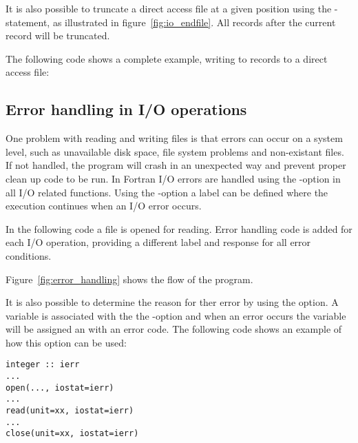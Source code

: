 
It is also possible to truncate a direct access file at a given position using the -statement, as illustrated in figure~\ref{fig:io_endfile}. All records after the current record will be truncated.


The following code shows a complete example, writing to records to a direct access file:



\subsection{Error handling in I/O operations}

One problem with reading and writing files is that errors can occur on a system level, such as unavailable disk space, file system problems and non-existant files. If not handled, the program will crash in an unexpected way and prevent proper clean up code to be run. In Fortran I/O errors are handled using the -option in all I/O related functions. Using the -option a label can be defined where the execution continues when an I/O error occurs. 

In the following code a file is opened for reading. Error handling code is added for each I/O operation, providing a different label and response for all error conditions. 



Figure~\ref{fig:error_handling} shows the flow of the program.


\newpage
It is also possible to determine the reason for ther error by using the  option. A variable is associated with the the -option and when an error occurs the variable will be assigned an with an error code. The following code shows an example of how this option can be used:

\begin{lstlisting}
integer :: ierr
...
open(..., iostat=ierr)
...
read(unit=xx, iostat=ierr)
...
close(unit=xx, iostat=ierr)
\end{lstlisting}

